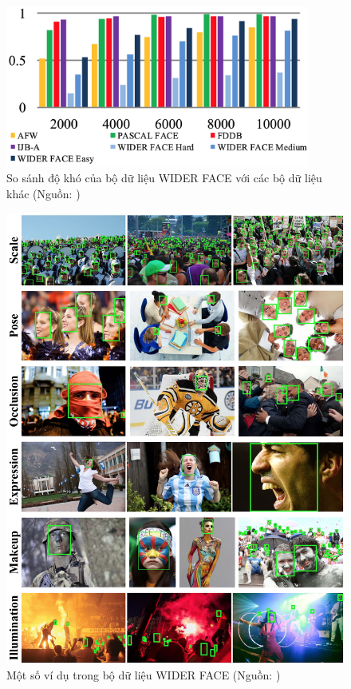{    \begin{figure}[H]
        \centering
        \includegraphics[width=10cm] {images/widerface_compare_2}
        \caption{So sánh độ khó của bộ dữ liệu WIDER FACE với các bộ dữ liệu khác (Nguồn: \cite{yang2016wider})}
        \label{fig:widerface_compare_2}
    \end{figure}

    \begin{figure}[H]
        \centering
        \includegraphics[width=15cm] {images/widerface_examples}
        \caption{Một số ví dụ trong bộ dữ liệu WIDER FACE (Nguồn: \cite{yang2016wider})}
        \label{fig:widerface_examples}
    \end{figure}

}
